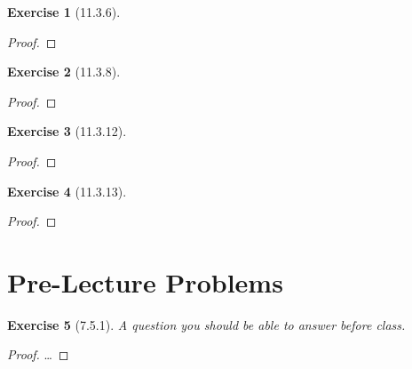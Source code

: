 \documentclass[12pt]{article}
\newtheorem*{exer}{Exercise}
\begin{document}
\begin{exer}[11.3.6]
\end{exer}

\begin{proof}
\end{proof}


\begin{exer}[11.3.8]
\end{exer}

\begin{proof}
\end{proof}


\begin{exer}[11.3.12]
\end{exer}

\begin{proof}
\end{proof}


\begin{exer}[11.3.13]
\end{exer}

\begin{proof}
\end{proof}

\section*{Pre-Lecture Problems}

\begin{exer}[7.5.1]

    A question you should be able to answer before class.

\end{exer}

\begin{proof}

    \dots

\end{proof}

\end{document}
